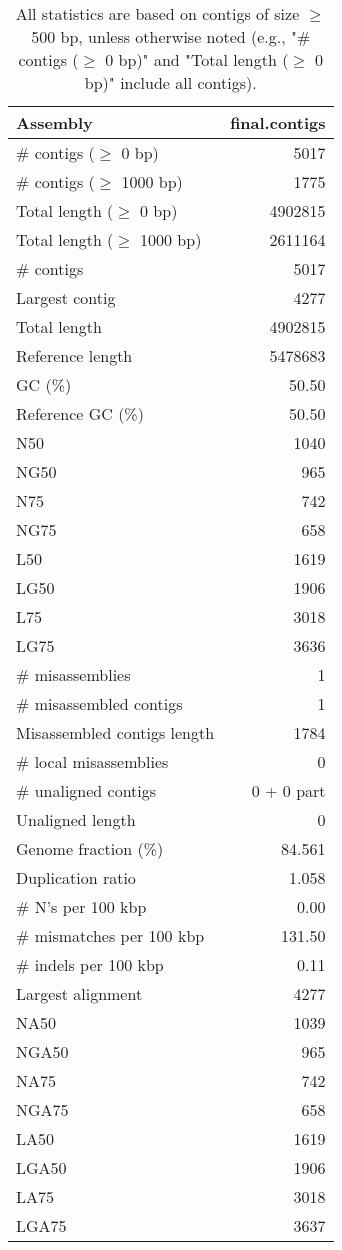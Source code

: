 \documentclass[12pt,a4paper]{article}
\begin{document}
\begin{table}[ht]
\begin{center}
\caption{All statistics are based on contigs of size $\geq$ 500 bp, unless otherwise noted (e.g., "\# contigs ($\geq$ 0 bp)" and "Total length ($\geq$ 0 bp)" include all contigs).}
\begin{tabular}{|l*{1}{|r}|}
\hline
Assembly & final.contigs \\ \hline
\# contigs ($\geq$ 0 bp) & 5017 \\ \hline
\# contigs ($\geq$ 1000 bp) & 1775 \\ \hline
Total length ($\geq$ 0 bp) & 4902815 \\ \hline
Total length ($\geq$ 1000 bp) & 2611164 \\ \hline
\# contigs & 5017 \\ \hline
Largest contig & 4277 \\ \hline
Total length & 4902815 \\ \hline
Reference length & 5478683 \\ \hline
GC (\%) & 50.50 \\ \hline
Reference GC (\%) & 50.50 \\ \hline
N50 & 1040 \\ \hline
NG50 & 965 \\ \hline
N75 & 742 \\ \hline
NG75 & 658 \\ \hline
L50 & 1619 \\ \hline
LG50 & 1906 \\ \hline
L75 & 3018 \\ \hline
LG75 & 3636 \\ \hline
\# misassemblies & 1 \\ \hline
\# misassembled contigs & 1 \\ \hline
Misassembled contigs length & 1784 \\ \hline
\# local misassemblies & 0 \\ \hline
\# unaligned contigs & 0 + 0 part \\ \hline
Unaligned length & 0 \\ \hline
Genome fraction (\%) & 84.561 \\ \hline
Duplication ratio & 1.058 \\ \hline
\# N's per 100 kbp & 0.00 \\ \hline
\# mismatches per 100 kbp & 131.50 \\ \hline
\# indels per 100 kbp & 0.11 \\ \hline
Largest alignment & 4277 \\ \hline
NA50 & 1039 \\ \hline
NGA50 & 965 \\ \hline
NA75 & 742 \\ \hline
NGA75 & 658 \\ \hline
LA50 & 1619 \\ \hline
LGA50 & 1906 \\ \hline
LA75 & 3018 \\ \hline
LGA75 & 3637 \\ \hline
\end{tabular}
\end{center}
\end{table}
\end{document}
